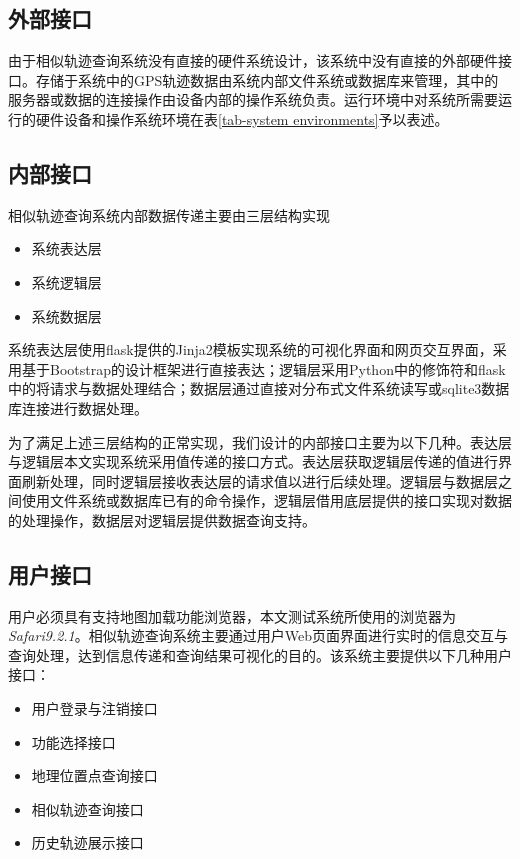 \subsection{外部接口}
\label{subsec:external interface}
由于相似轨迹查询系统没有直接的硬件系统设计，该系统中没有直接的外部硬件接口。存储于系统中的GPS轨迹数据由系统内部文件系统或数据库来管理，其中的服务器或数据的连接操作由设备内部的操作系统负责。运行环境中对系统所需要运行的硬件设备和操作系统环境在表\ref{tab-system environments}予以表述。

\subsection{内部接口}
\label{subsec:internal interface}
相似轨迹查询系统内部数据传递主要由三层结构实现
\begin{itemize}
	\item 系统表达层
	\item 系统逻辑层
	\item 系统数据层
\end{itemize}
系统表达层使用flask提供的Jinja2\cite{flasklibrary}模板实现系统的可视化界面和网页交互界面，采用基于Bootstrap的设计框架进行直接表达；逻辑层采用Python中的修饰符和flask中的将请求与数据处理结合；数据层通过直接对分布式文件系统读写或sqlite3数据库连接进行数据处理。

\begin{figure}[!htp]
    \centering
    \resizebox{!}{!}{}
\end{figure}

为了满足上述三层结构的正常实现，我们设计的内部接口主要为以下几种。表达层与逻辑层本文实现系统采用值传递的接口方式。表达层获取逻辑层传递的值进行界面刷新处理，同时逻辑层接收表达层的请求值以进行后续处理。逻辑层与数据层之间使用文件系统或数据库已有的命令操作，逻辑层借用底层提供的接口实现对数据的处理操作，数据层对逻辑层提供数据查询支持。

\subsection{用户接口}
\label{ubsection:user interface}
用户必须具有支持地图加载功能浏览器，本文测试系统所使用的浏览器为\emph{Safari9.2.1}。相似轨迹查询系统主要通过用户Web页面界面进行实时的信息交互与查询处理，达到信息传递和查询结果可视化的目的。该系统主要提供以下几种用户接口：
\begin{itemize}
	\item 用户登录与注销接口
	\item 功能选择接口
	\item 地理位置点查询接口
	\item 相似轨迹查询接口
	\item 历史轨迹展示接口
\end{itemize}

